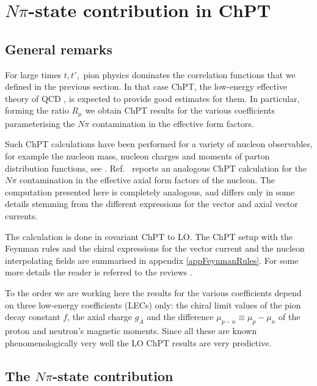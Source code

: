 \documentclass[11pt,prd,aps,showpacs,eqsecnum,floatfix,nofootinbib,preprint,tightenlines]{revtex4}
\begin{document}
\section{$N\pi$-state contribution in ChPT}\label{sec:ffchpt} 

\subsection{General remarks}

For large times $t,t',$ pion physics dominates the correlation functions that we defined in the previous section. In that case ChPT, the low-energy effective theory of QCD \cite{Weinberg:1978kz,Gasser:1983yg,Gasser:1984gg}, is expected to provide good estimates for them. In particular, forming the ratio $R_{\mu}$ we obtain ChPT results for the various  coefficients parameterising the $N\pi$ contamination in the effective form factors. 

Such ChPT calculations have been performed for a variety of nucleon observables, for example the nucleon mass, nucleon charges and moments of parton distribution functions, see \cite{Bar:2015zwa,Tiburzi:2015tta,Bar:2016uoj,Bar:2016jof}. Ref.\ \cite{Bar:2018xyi} reports an analogous ChPT calculation for the $N\pi$ contamination in the effective axial form factors of the nucleon. The computation presented here is completely analogous, and differs only in some details stemming from the different expressions for the vector and axial vector currents.

The calculation is done in covariant ChPT \cite{Gasser:1987rb,Becher:1999he} to LO. The ChPT setup with the Feynman rules and the chiral expressions for the vector current and the nucleon interpolating fields are summarised in appendix \ref{appFeynmanRules}. For some more details the reader is referred to the reviews \cite{Bar:2017kxh,Bar:2017gqh}.

To the order we are working here the results for the various coefficients depend on three low-energy coefficients (LECs) only: the chiral limit values of the pion decay constant $f$,  the axial charge $g_A$ and the difference $\mu_{p-n}\equiv \mu_p-\mu_n$ of the proton and neutron's magnetic moments. Since all these are known phenomenologically very well the LO ChPT results are very predictive.  

\subsection{The $N\pi$-state contribution}\label{ssect:Npicontribution}
\end{document}

